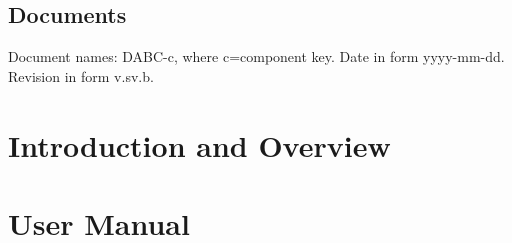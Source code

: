 \documentclass{dabcclass}
\begin{document}
 \cleardoublepage
\thispagestyle{empty} \tableofcontents \thispagestyle{empty} \cleardoublepage
{}

 \cleardoublepage
 \cleardoublepage
 \cleardoublepage
 \cleardoublepage
 \cleardoublepage

\setcounter{chapter}{0}
\chapter{Documents}
Document names: DABC-c, where c=component key. Date in form yyyy-mm-dd.
Revision in form v.sv.b.\\

%



%
%

%
%
\cleardoublepage
\part{Introduction and Overview}
 \cleardoublepage
\part{User Manual}
 \cleardoublepage
\end{document}
